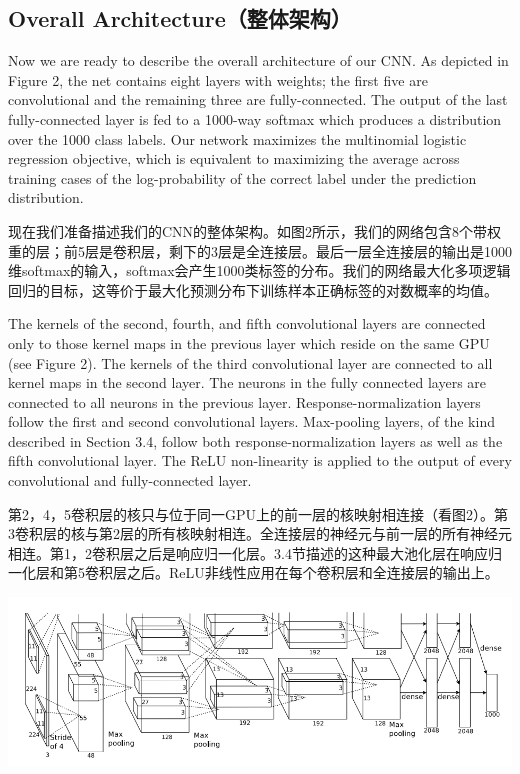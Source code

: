 \documentclass[12pt,a4paper,UTF8,twoside]{book}
\begin{document}
\hypertarget{overall-architectureux6574ux4f53ux67b6ux6784}{%
\subsection{Overall Architecture（整体架构）}\label{overall-architectureux6574ux4f53ux67b6ux6784}}

Now we are ready to describe the overall architecture of our CNN. As depicted in Figure 2, the net contains eight layers with weights; the first five are convolutional and the remaining three are fully-connected. The output of the last fully-connected layer is fed to a 1000-way softmax which produces a distribution over the 1000 class labels. Our network maximizes the multinomial logistic regression objective, which is equivalent to maximizing the average across training cases of the log-probability of the correct label under the prediction distribution.

现在我们准备描述我们的CNN的整体架构。如图2所示，我们的网络包含8个带权重的层；前5层是卷积层，剩下的3层是全连接层。最后一层全连接层的输出是1000维softmax的输入，softmax会产生1000类标签的分布。我们的网络最大化多项逻辑回归的目标，这等价于最大化预测分布下训练样本正确标签的对数概率的均值。

The kernels of the second, fourth, and fifth convolutional layers are connected only to those kernel maps in the previous layer which reside on the same GPU (see Figure 2). The kernels of the third convolutional layer are connected to all kernel maps in the second layer. The neurons in the fully connected layers are connected to all neurons in the previous layer. Response-normalization layers follow the first and second convolutional layers. Max-pooling layers, of the kind described in Section 3.4, follow both response-normalization layers as well as the fifth convolutional layer. The ReLU non-linearity is applied to the output of every convolutional and fully-connected layer.

第2，4，5卷积层的核只与位于同一GPU上的前一层的核映射相连接（看图2）。第3卷积层的核与第2层的所有核映射相连。全连接层的神经元与前一层的所有神经元相连。第1，2卷积层之后是响应归一化层。3.4节描述的这种最大池化层在响应归一化层和第5卷积层之后。ReLU非线性应用在每个卷积层和全连接层的输出上。

\begin{center}\includegraphics[width=0.7\linewidth]{img/01-02} \end{center}
\end{document}
